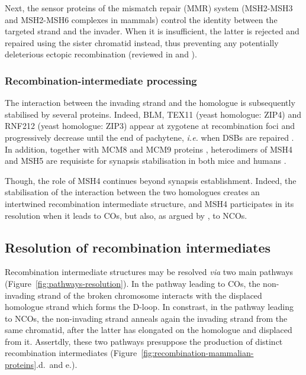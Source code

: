Next, the sensor proteins of the mismatch repair (MMR) system (MSH2-MSH3 and MSH2-MSH6 complexes in mammals) control the identity between the targeted strand and the invader.
When it is insufficient, the latter is rejected and repaired using the sister chromatid instead, thus preventing any potentially deleterious ectopic recombination (reviewed in \citealp{surtees2004mismatch} and \citealp{goldfarb2010frequent}).


\subsubsection{Recombination-intermediate processing}
The interaction between the invading strand and the homologue is subsequently stabilised by several proteins.
Indeed, BLM, TEX11 (yeast homologue: ZIP4) and RNF212 (yeast homologue: ZIP3) appear at zygotene at recombination foci and progressively decrease until the end of pachytene, \textit{i.e.} when DSBs are repaired \citep[reviewed in][]{baudat2013meiotic}. 
In addition, together with MCM8 and MCM9 proteins \citep{lutzmann2012mcm8}, heterodimers of MSH4 and MSH5 \citep{scully1997association} are requisiste for synapsis stabilisation in both mice \citep{devries1999mouse,kneitz2000muts} and humans \citep{snowden2004hmsh4hmsh5}.

Though, the role of MSH4 continues beyond synapsis establishment. 
Indeed, the stabilisation of the interaction between the two homologues creates an intertwined recombination intermediate structure, and MSH4 participates in its resolution when it leads to COs, but also, as argued by \citet{baudat2007regulating}, to NCOs.





\subsection{Resolution of recombination intermediates}
\label{chap2:resolution-intermediates}

Recombination intermediate structures may be resolved \textit{via} two main pathways (Figure~\ref{fig:pathways-resolution}).
In the pathway leading to COs, the non-invading strand of the broken chromosome interacts with the displaced homologue strand which forms the D-loop.
In constrast, in the pathway leading to NCOs, the non-invading strand anneals again the invading strand from the same chromatid, after the latter has elongated on the homologue and displaced from it.
Assertdly, these two pathways presuppose the production of distinct recombination intermediates (Figure~\ref{fig:recombination-mammalian-proteins}.d.\ and e.).


